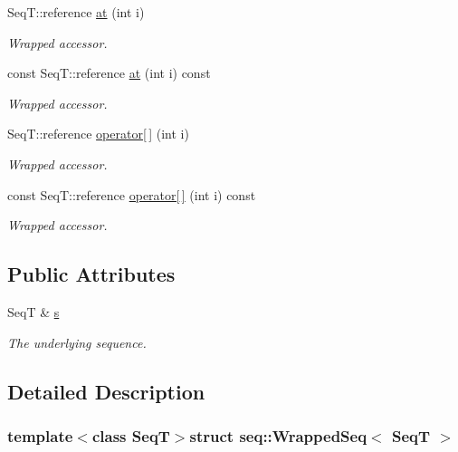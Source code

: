 {\bf }\par
\begin{DoxyCompactItemize}
\item 
Seq\-T\-::reference \hyperlink{structseq_1_1_wrapped_seq_a2267a0d93467dc4db6b64a9914a0e265}{at} (int i)
\begin{DoxyCompactList}\small\item\em Wrapped accessor. \end{DoxyCompactList}\item 
const Seq\-T\-::reference \hyperlink{structseq_1_1_wrapped_seq_a09864746e7dfb9e0d1ef6ebc59a9a4e8}{at} (int i) const 
\begin{DoxyCompactList}\small\item\em Wrapped accessor. \end{DoxyCompactList}\item 
Seq\-T\-::reference \hyperlink{structseq_1_1_wrapped_seq_a7ffd5783fc6d50fad65f89e6e2cc8489}{operator\mbox{[}$\,$\mbox{]}} (int i)
\begin{DoxyCompactList}\small\item\em Wrapped accessor. \end{DoxyCompactList}\item 
const Seq\-T\-::reference \hyperlink{structseq_1_1_wrapped_seq_a562c969d3a8f3c8aeede89d25747ba64}{operator\mbox{[}$\,$\mbox{]}} (int i) const 
\begin{DoxyCompactList}\small\item\em Wrapped accessor. \end{DoxyCompactList}\end{DoxyCompactItemize}

\subsection*{Public Attributes}
\begin{DoxyCompactItemize}
\item 
Seq\-T \& \hyperlink{structseq_1_1_wrapped_seq_a838d548016ce08b745cb29dbee635437}{s}
\begin{DoxyCompactList}\small\item\em The underlying sequence. \end{DoxyCompactList}\end{DoxyCompactItemize}


\subsection{Detailed Description}
\subsubsection*{template$<$class Seq\-T$>$struct seq\-::\-Wrapped\-Seq$<$ Seq\-T $>$}

